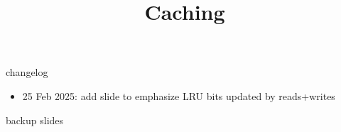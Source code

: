 \graphicspath{{./figures/}}
\title{Caching}
\date{}





{\changelogmode
\begin{frame}{changelog}
\begin{itemize}
\item 25 Feb 2025: add slide to emphasize LRU bits updated by reads+writes
\end{itemize}
\end{frame}
}



\begin{frame}{backup slides}
\end{frame}




